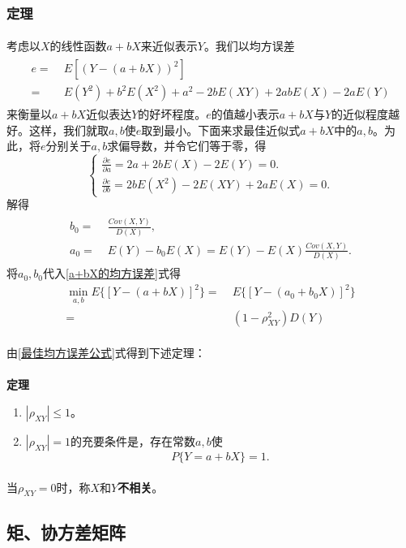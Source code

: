 \subsubsection{定理}
\paragraph{}
考虑以$X$的线性函数$a+bX$来近似表示$Y$。我们以均方误差
\begin{align}
\begin{split}
  \label{a+bX的均方误差}
  e =& \; E[(Y-(a+bX))^2] \\
    =& \; E(Y^2) + b^2E(X^2) + a^2 - 2bE(XY) + 2abE(X) - 2aE(Y)
\end{split}
\end{align}
来衡量以$a+bX$近似表达$Y$的好坏程度。$e$的值越小表示$a+bX$与$Y$的近似程度越好。这样，我们就取$a,b$使$e$取到最小。下面来求最佳近似式$a+bX$中的$a,b$。为此，将$e$分别关于$a,b$求偏导数，并令它们等于零，得
\begin{equation}
\left\{
  \begin{array}{l}
    \frac{\partial e}{\partial a} = 2a + 2bE(X) - 2E(Y) = 0. \\
    \frac{\partial e}{\partial b} = 2bE(X^2) - 2E(XY) + 2aE(X) = 0.
  \end{array}
\right.
\end{equation}
解得
\begin{align}
\begin{split}
  b_0 =&\; \frac{Cov(X,Y)}{D(X)}, \\
  a_0 =&\; E(Y) - b_0E(X) = E(Y) - E(X)\frac{Cov(X,Y)}{D(X)}.
\end{split}
\end{align}
将$a_0,b_0$代入\eqref{a+bX的均方误差}式得
\begin{align}
  \label{最佳均方误差公式}
  \min_{a,b}E\{[Y-(a+bX)]^2\} =&\; E\{[Y-(a_0+b_0X)]^2\} \\
                     =&\; (1-\rho_{XY}^2)D(Y)
\end{align}

\paragraph{}
由\eqref{最佳均方误差公式}式得到下述定理：

\paragraph{}
\textbf{定理\;}
\begin{enumerate}
  \item $|\rho_{XY}| \leq 1$。
  \item $|\rho_{XY}| = 1$的充要条件是，存在常数$a,b$使
  \begin{equation}
    P\{Y = a+bX\} = 1.
  \end{equation}
\end{enumerate}

\paragraph{}
当$\rho_{XY} = 0$时，称$X$和$Y$\textbf{不相关}。

\subsection{矩、协方差矩阵}
\paragraph{}
